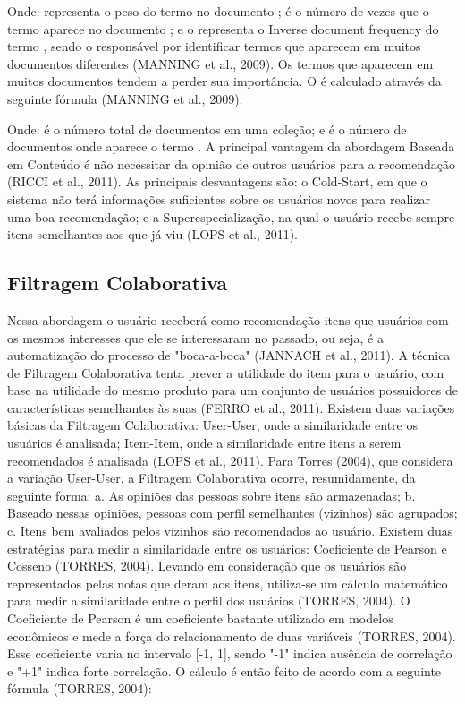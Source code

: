 Onde: representa o peso do termo  no documento ;  é o número de vezes que o termo  aparece no documento ; e o  representa o Inverse document frequency do termo , sendo o responsável por identificar termos que aparecem em muitos documentos diferentes (MANNING et al., 2009). Os termos que aparecem em muitos documentos tendem a perder sua importância. O  é calculado através da seguinte fórmula (MANNING et al., 2009):

Onde:  é o número total de documentos em uma coleção; e  é o número de documentos onde aparece o termo .
A principal vantagem da abordagem Baseada em Conteúdo é não necessitar da opinião de outros usuários para a recomendação (RICCI et al., 2011). As principais desvantagens são: o Cold-Start, em que o sistema não terá informações suficientes sobre os usuários novos para realizar uma boa recomendação; e a Superespecialização, na qual o usuário recebe sempre itens semelhantes aos que já viu (LOPS et al., 2011).

\subsection{Filtragem Colaborativa}

Nessa abordagem o usuário receberá como recomendação itens que usuários com os mesmos interesses que ele se interessaram no passado, ou seja, é a automatização do processo de "boca-a-boca" (JANNACH et al., 2011). A técnica de Filtragem Colaborativa tenta prever a utilidade  do item para o usuário, com base na utilidade do mesmo produto para um conjunto de usuários  possuidores de características semelhantes às suas (FERRO et al., 2011).
Existem duas variações básicas da Filtragem Colaborativa: User-User, onde a similaridade entre os usuários é analisada; Item-Item, onde a similaridade entre itens a serem recomendados é analisada (LOPS et al., 2011).
Para Torres (2004), que considera a variação User-User, a Filtragem Colaborativa ocorre, resumidamente, da seguinte forma:
a.  As opiniões das pessoas sobre itens são armazenadas;
b.  Baseado nessas opiniões, pessoas com perfil semelhantes (vizinhos) são agrupados;
c.  Itens bem avaliados pelos vizinhos são recomendados ao usuário.
Existem duas estratégias para medir a similaridade entre os usuários: Coeficiente de Pearson e Cosseno (TORRES, 2004). Levando em consideração que os usuários são representados pelas notas que deram aos itens, utiliza-se um cálculo matemático para medir a similaridade entre o perfil dos usuários (TORRES, 2004).
O Coeficiente de Pearson é um coeficiente bastante utilizado em modelos econômicos e mede a força do relacionamento de duas variáveis (TORRES, 2004). Esse coeficiente varia no intervalo [-1, 1], sendo "-1" indica ausência de correlação e "+1" indica forte correlação. O cálculo é então feito de acordo com a seguinte fórmula (TORRES, 2004):

